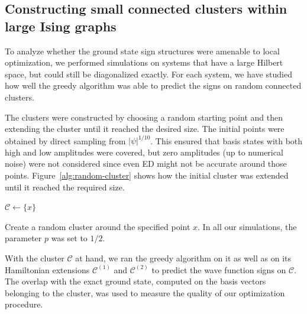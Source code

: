 \subsection{Constructing small connected clusters within large Ising graphs}

To analyze whether the ground state sign structures were amenable to local optimization, we performed simulations on systems that have a large Hilbert space, but could still be diagonalized exactly. For each system, we have studied how well the greedy algorithm was able to predict the signs on random connected clusters.

The clusters were constructed by choosing a random starting point and then extending the cluster until it reached the desired size. The initial points were obtained by direct sampling from $|\psi|^{1/10}$. This ensured that basis states with both high and low amplitudes were covered, but zero amplitudes (up to numerical noise) were not considered since even ED might not be accurate around those points. Figure~\ref{alg:random-cluster} shows how the initial cluster was extended until it reached the required size.

\begin{algorithm}[H]\label{alg:random-cluster}
    \small
    \DontPrintSemicolon
        $\mathcal{C} \longleftarrow \{ x \}$\;
    \vspace{10pt}
\caption{Create a random cluster around the specified point $x$. In all our simulations, the parameter $p$ was set to $1/2$.}
\end{algorithm}

With the cluster $\mathcal{C}$ at hand, we ran the greedy algorithm on it as well as on its Hamiltonian extensions $\mathcal{C}^{(1)}$ and $\mathcal{C}^{(2)}$ to predict the wave function signs on $\mathcal{C}$. The overlap with the exact ground state, computed on the basis vectors belonging to the cluster, was used to measure the quality of our optimization procedure.

